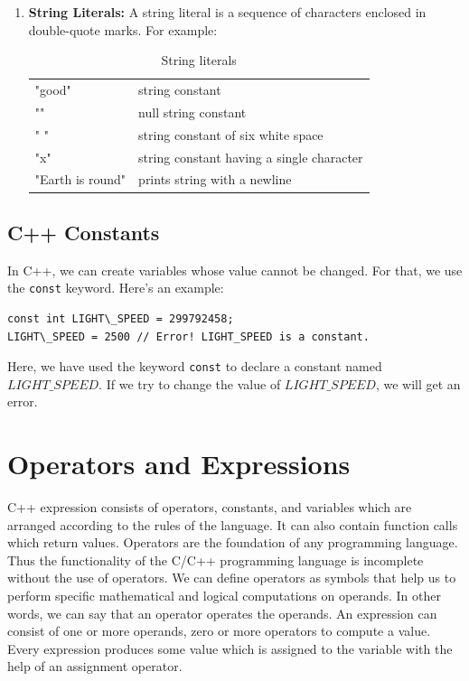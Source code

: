 \documentclass{book}
\begin{document}
\begin{enumerate}
\item \textbf{String Literals: }
A string literal is a sequence of characters enclosed in double-quote marks. For example:

\begin{table}[h]
\centering
\begin{tabular}{ll} \hline 
"good"	& string constant \\
""	& null string constant \\
" "	& string constant of six white space \\
"x"	& string constant having a single character \\
"Earth is round\n"	& prints string with a newline \\ \hline 
\end{tabular}
\caption{String literals}
\label{}
\end{table}
\end{enumerate}

\subsection{C++ Constants}

In C++, we can create variables whose value cannot be changed. For that, we use the \texttt{const} keyword. Here's an example:

\begin{verbatim}
const int LIGHT\_SPEED = 299792458;
LIGHT\_SPEED = 2500 // Error! LIGHT_SPEED is a constant.
\end{verbatim}

Here, we have used the keyword \texttt{const} to declare a constant named $LIGHT\_SPEED$. If we try to change the value of $LIGHT\_SPEED$, we will get an error.

\section{Operators and Expressions}

C++ expression consists of operators, constants, and variables which are arranged according to the rules of the language. It can also contain function calls which return values. Operators are the foundation of any programming language. Thus the functionality of the C/C++ programming language is incomplete without the use of operators. We can define operators as symbols that help us to perform specific mathematical and logical computations on operands. In other words, we can say that an operator operates the operands. An expression can consist of one or more operands, zero or more operators to compute a value. Every expression produces some value which is assigned to the variable with the help of an assignment operator.
\end{document}
